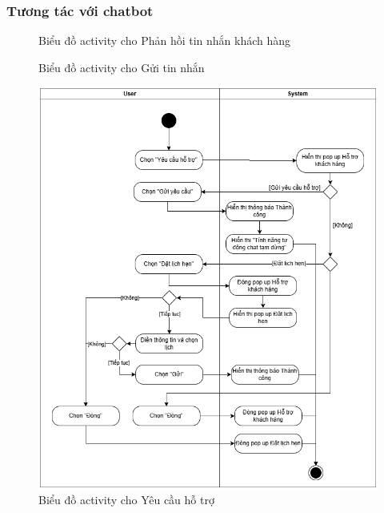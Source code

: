 \subsubsection{Tương tác với chatbot}
\begin{figure}[H]
    \centering
     
    \vspace{0.5cm}
    \caption{Biểu đồ activity cho Phản hồi tin nhắn khách hàng}
    \label{fig:enter-label}
\end{figure}
\begin{figure}[H]
    \centering
     
    \vspace{0.5cm}
    \caption{Biểu đồ activity cho Gửi tin nhắn}
    \label{fig:enter-label}
\end{figure}
\begin{figure}[H]
    \centering
    \includegraphics[width=1\textwidth]{Dg_Activity/NeedSupport.png}
    \vspace{0.5cm}
    \caption{Biểu đồ activity cho Yêu cầu hỗ trợ}
    \label{fig:enter-label}
\end{figure}


